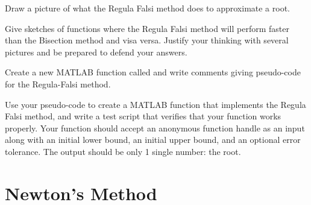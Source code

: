 \begin{problem}
    Draw a picture of what the Regula Falsi method does to approximate a root.
\end{problem}


\begin{problem}
    Give sketches of functions where the Regula Falsi method will perform faster than the
    Bisection method and visa versa.  Justify your thinking with several pictures and be
    prepared to defend your answers.
\end{problem}

\begin{problem}
    Create a new MATLAB function called  and write comments giving pseudo-code
    for the Regula-Falsi method.
\end{problem}

\begin{problem}
   Use your pseudo-code to create a MATLAB function that implements the Regula Falsi method, and write a test script
   that verifies that your function works properly. Your function should accept an
    anonymous function handle as an input along with an initial lower bound, an initial
    upper bound, and an optional error tolerance. The output should be only 1 single number: the
    root.\\
\end{problem}



\newpage\section{Newton's Method}

